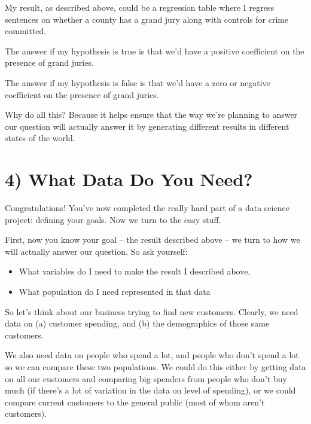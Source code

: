\documentclass[letterpaper,10pt,english]{jupyterBook}
\begin{document}
\sphinxAtStartPar
My result, as described above, could be a regression table where I regress sentences on whether a county has a grand jury along with controls for crime committed.

\sphinxAtStartPar
The answer if my hypothesis is true is that we’d have a positive coefficient on the presence of grand juries.

\sphinxAtStartPar
The answer if my hypothesis is false is that we’d have a zero or negative coefficient on the presence of grand juries.

\sphinxAtStartPar
Why do all this? Because it helps ensure that the way we’re planning to answer our question will actually answer it by generating different results in different states of the world.


\section{4) What Data Do You Need?}
\label{\detokenize{40_in_practice/05_backwards_design:what-data-do-you-need}}
\sphinxAtStartPar
Congratulations! You’ve now completed the really hard part of a data science project: defining your goals. Now we turn to the easy stuff.

\sphinxAtStartPar
First, now you know your goal – the result described above – we turn to how we will actually answer our question. So ask yourself:
\begin{itemize}
\item {} 
\sphinxAtStartPar
What variables do I need to make the result I described above,

\item {} 
\sphinxAtStartPar
What population do I need represented in that data

\end{itemize}

\sphinxAtStartPar
So let’s think about our business trying to find new customers. Clearly, we need data on (a) customer spending, and (b) the demographics of those same customers.

\sphinxAtStartPar
We also need data on  people who spend a lot, and people who don’t spend a lot so we can compare these two populations. We could do this either by getting data on all our customers and comparing big spenders from people who don’t buy much (if there’s a lot of variation in the data on level of spending), or we could compare current customers to the general public (most of whom aren’t customers).
\end{document}
